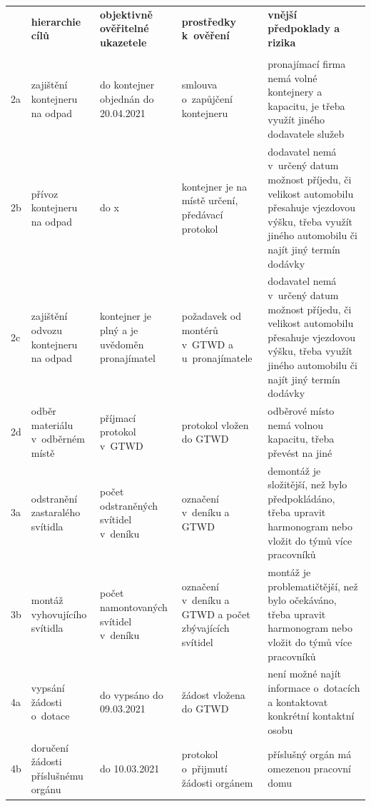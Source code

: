 \documentclass[a4paper, twoside, 11pt]{article}
\begin{document}
		\begin{table}[H]
		\centering
		\resizebox{1 \textwidth}{!}
		{
		\begin{tabular}{ !{\vrule width 2pt} p{5cm} | p{5cm} | p{5cm} | p{5cm} | p{5cm} !{\vrule width 2pt} }
	 & \textbf{hierarchie cílů} & \textbf{objektivně ověřitelné ukazetele} & \textbf{prostředky k~ověření} & \textbf{vnější předpoklady a rizika}  \\ 
	 \\ 
	2a & zajištění kontejneru na odpad & do kontejner objednán do 20.04.2021 & smlouva o~zapůjčení kontejneru & pronajímací firma nemá volné kontejnery a kapacitu, je třeba využít jiného dodavatele služeb \\ \hline
	2b & přívoz kontejneru na odpad & do x & kontejner je na místě určení, předávací protokol & dodavatel nemá v~určený datum možnost příjedu, či velikost automobilu přesahuje vjezdovou výšku, třeba využít jiného automobilu či najít jiný termín dodávky  \\ \hline
	2c & zajištění odvozu kontejneru na odpad & kontejner je plný a je uvědoměn pronajímatel & požadavek od montérů v~GTWD a u~pronajímatele & dodavatel nemá v~určený datum možnost příjedu, či velikost automobilu přesahuje vjezdovou výšku, třeba využít jiného automobilu či najít jiný termín dodávky  \\ \hline
	2d & odběr materiálu v~odběrném místě & příjmací protokol v~GTWD & protokol vložen do GTWD & odběrové místo nemá volnou kapacitu, třeba převést na jiné \\ \hline
	3a & odstranění zastaralého svítidla & počet odstraněných svítidel v~deníku & označení v~deníku a GTWD & demontáž je složitější, než bylo předpokládáno, třeba upravit harmonogram nebo vložit do týmů více pracovníků \\ \hline
	3b & montáž vyhovujícího svítidla & počet namontovaných svítidel v~deníku & označení v~deníku a GTWD a počet zbývajících svítidel & montáž je problematičtější, než bylo očekáváno, třeba upravit harmonogram nebo vložit do týmů více pracovníků   \\ \hline
	4a & vypsání žádosti o~dotace & do vypsáno do 09.03.2021 & žádost vložena do GTWD & není možné najít informace o~dotacích a kontaktovat konkrétní kontaktní osobu  \\ \hline
	4b & doručení žádosti příslušnému orgánu & do 10.03.2021 & protokol o~přijmutí žádosti orgánem & příslušný orgán má omezenou pracovní domu \\ \hline

\end{tabular}}
\end{table}
\end{document}
